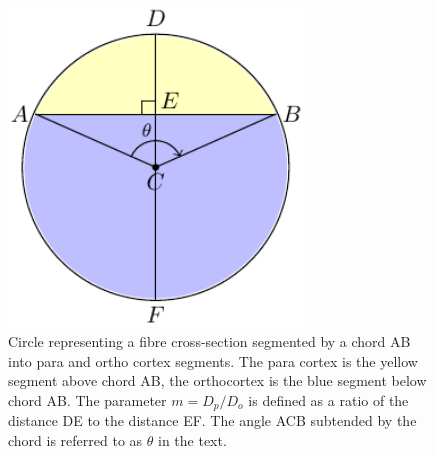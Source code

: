 %

\begin{figure}[!h]
  \centering
  \includegraphics[width=0.7\textwidth]{xsect.pdf}
  \caption{Circle representing a fibre cross-section segmented by a chord AB into para and ortho cortex segments. The para cortex is the yellow segment above chord AB, the orthocortex is the blue segment below chord AB. The parameter $m = D_{p}/D_{o}$ is defined as a ratio of the distance DE to the distance EF. The angle ACB subtended by the chord is referred to as $\theta$ in the text.}
  \label{fig:opmeas}
\end{figure}

%

